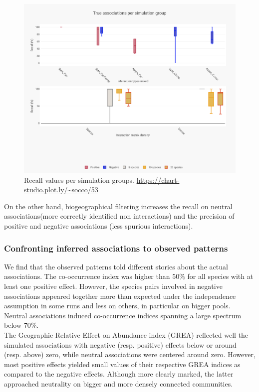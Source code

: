 \documentclass[]{article}
\begin{document}
\begin{figure}[H]
	\includegraphics[scale=0.155]{sim_perf}
	\caption{Recall values per simulation groups. \url{https://chart-studio.plot.ly/~socco/53}}
	\label{simperf}
\end{figure}

\noindent On the other hand, biogeographical filtering increases the recall on neutral associations(more correctly identified non interactions) and the precision of positive and negative associations (less spurious interactions).

\subsubsection{Confronting inferred associations to observed patterns}
We find that the observed patterns told different stories about the actual associations. The co-occurrence index was higher than $50\%$ for all species with at least one positive effect. However, the species pairs involved in negative associations appeared together more than expected under the independence assumption in some runs and less on others, in particular on bigger pools. Neutral associations induced co-occurrence indices spanning a large spectrum below $70\%$. \\

\noindent The Geographic Relative Effect on Abundance index (GREA) reflected well the simulated associations with negative (resp. positive) effects below or around (resp. above) zero, while neutral associations were centered around zero. However, most positive effects yielded small values of their respective GREA indices as compared to the negative effects. Although more clearly marked, the latter approached neutrality on bigger and more densely connected communities. \\ 
\end{document}
